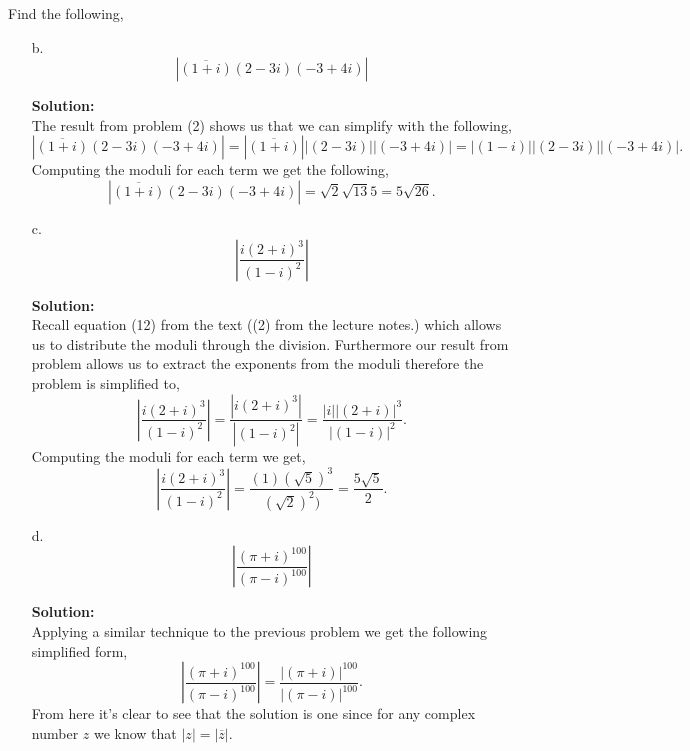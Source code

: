 \documentclass[12pt]{article}
\makeatletter
\theoremstyle{homework}
\newenvironment{exercise}[1]
{\def\@currentlabel{#1}\exercisecore}
{\endexercisecore}
\newcommand{\localhead}[1]{\par\smallskip\noindent\textbf{#1}\nobreak\\}%
\newcommand\solution{\localhead{Solution:}}
\makeatother
\begin{document}
\begin{exercise}{5} Find the following, \\
    \begin{enumerate}
        \item[b.] 
        \begin{equation*}
            |\overline{(1 + i)}(2 - 3i)(-3 + 4i)|
        \end{equation*} 
        \solution The result from problem (2) shows us that we can simplify with the following, 
        \begin{equation*}
            |\overline{(1 + i)}(2 - 3i)(-3 + 4i)| = |\overline{(1 + i)}||(2 - 3i)||(-3 + 4i)| = |(1 - i)||(2 - 3i)||(-3 + 4i)|.
        \end{equation*}
        Computing the moduli for each term we get the following, 
        \begin{equation*}
            |\overline{(1 + i)}(2 - 3i)(-3 + 4i)| = \sqrt{2}\sqrt{13}5 = 5\sqrt{26}.
        \end{equation*} 
        \vspace{.5in}
        \item[c.]
        \begin{equation*}
            \left|\dfrac{i(2 + i)^3}{(1 - i)^2}\right|
        \end{equation*}
        \solution Recall equation (12) from the text ((2) from the lecture notes.) which allows us to distribute the moduli through the division. Furthermore our result from problem allows us 
        to extract the exponents from the moduli therefore the problem is simplified to, 
        \begin{equation*}
            \left|\dfrac{i(2 + i)^3}{(1 - i)^2}\right| = \dfrac{|i(2 + i)^3|}{|(1 - i)^2|} = \dfrac{|i||(2 + i)|^3}{|(1 - i)|^2}. 
        \end{equation*}
        Computing the moduli for each term we get, 
        \begin{equation*}
            \left|\dfrac{i(2 + i)^3}{(1 - i)^2}\right| = \dfrac{(1)(\sqrt{5})^3}{(\sqrt{2})^2)} = \dfrac{5\sqrt{5}}{2}.
        \end{equation*}
        \item[d.] 
        \begin{equation*}
            \left|\dfrac{(\pi + i)^{100}}{(\pi - i)^{100}}\right|
        \end{equation*}  
        \solution Applying a similar technique to the previous problem we get the following simplified form, 
        \begin{equation*}
            \left|\dfrac{(\pi + i)^{100}}{(\pi - i)^{100}}\right| = \dfrac{|(\pi + i)|^{100}}{|(\pi - i)|^{100}}. 
        \end{equation*}
        From here it's clear to see that the solution is one since for any complex number $z$ we know that $|z| = |\overline{z}|$. 
    \end{enumerate}
\end{exercise}
\vspace{.15in}
\end{document}
